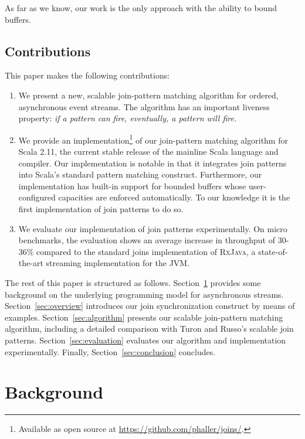 \documentclass[runningheads]{llncs}
\begin{document}
\begin{sloppypar}
As far as we know, our work is the only approach with the ability to bound buffers.

\subsection{Contributions}\label{sec:contribs}

This paper makes the following contributions:

\begin{enumerate}

\item We present a new, scalable join-pattern matching algorithm for ordered,
asynchronous event streams. The algorithm has an important liveness property:
{\em if a pattern can fire, eventually, a pattern will fire.}

\item We provide an implementation\footnote{Available as open source at
\url{https://github.com/phaller/joins/}.} of our join-pattern matching
algorithm for Scala 2.11, the current stable release of the mainline Scala
language and compiler. Our implementation is notable in that it integrates
join patterns into Scala's standard pattern matching construct. Furthermore,
our implementation has built-in support for bounded buffers whose
user-configured capacities are enforced automatically. To our knowledge it is the
first implementation of join patterns to do so.

\item We evaluate our implementation of join patterns experimentally. On micro
benchmarks, the evaluation shows an average increase in throughput of 30-36\%
compared to the standard joins implementation of \textsc{RxJava}, a
state-of-the-art streaming implementation for the JVM.

\end{enumerate}

The rest of this paper is structured as follows. Section~\ref{sec:background}
provides some background on the underlying programming model for asynchronous
streams. Section~\ref{sec:overview} introduces our join synchronization
construct by means of examples. Section~\ref{sec:algorithm} presents our
scalable join-pattern matching algorithm, including a detailed comparison with
Turon and Russo's scalable join patterns.
Section~\ref{sec:evaluation} evaluates our algorithm and implementation
experimentally. Finally, Section~\ref{sec:conclusion} concludes.


\section{Background}\label{sec:background}


\end{sloppypar}
\end{document}
